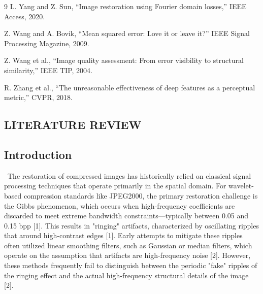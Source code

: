 \documentclass[12pt]{article}
\begin{document}
\begin{thebibliography}{9}
L. Yang and Z. Sun, “Image restoration using Fourier domain losses,” IEEE Access, 2020.

Z. Wang and A. Bovik, “Mean squared error: Love it or leave it?” IEEE Signal Processing Magazine, 2009.

Z. Wang et al., “Image quality assessment: From error visibility to structural similarity,” IEEE TIP, 2004.

R. Zhang et al., “The unreasonable effectiveness of deep features as a perceptual metric,” CVPR, 2018.

\end{thebibliography}

\clearpage

\begin{center}
  \section*{{\large L}\small{ITERATURE} {\large R}\small{EVIEW}} 
\end{center}

\vspace{20}

\subsection*{Introduction}

\quad \, The restoration of compressed images has historically relied on classical signal processing techniques that operate primarily in the spatial domain. For wavelet-based compression standards like JPEG2000, the primary restoration challenge is the Gibbs phenomenon, which occurs when high-frequency coefficients are discarded to meet extreme bandwidth constraints—typically between 0.05 and 0.15 bpp [1]. This results in "ringing" artifacts, characterized by oscillating ripples that around high-contrast edges [1]. Early attempts to mitigate these ripples often utilized linear smoothing filters, such as Gaussian or median filters, which operate on the assumption that artifacts are high-frequency noise [2]. However, these methods frequently fail to distinguish between the periodic "fake" ripples of the ringing effect and the actual high-frequency structural details of the image [2]. \\
\end{document}
